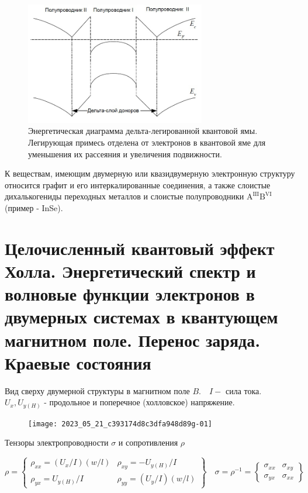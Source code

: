 \begin{figure} [h!]
\centering
    \includegraphics[width=0.7\textwidth]{images/ph28.4.jpg}
\caption*{Энергетическая диаграмма дельта-легированной квантовой ямы. Легирующая примесь отделена от электронов в квантовой яме для
уменьшения их рассеяния и увеличения подвижности.}
\end{figure}

К веществам, имеющим двумерную или квазидвумерную электронную структуру относится графит и его интеркалированные соединения, а также слоистые дихалькогениды переходных металлов и слоистые  полупроводники $\mathrm{A}^{\text {III}}\mathrm{B}^{\text {VI}}$ (пример - InSe).


\section{Целочисленный квантовый эффект Холла. Энергетический спектр и волновые функции электронов в двумерных системах в квантующем магнитном поле. Перенос заряда. Краевые состояния}

Вид сверху двумерной структуры в магнитном поле $B. \quad I-$ сила тока. $U_{x}, U_{y(H)}$ - продольное и поперечное (холловское) напряжение.

\begin{figure}[h!]
    \centering
    \texttt{[image: 2023\_05\_21\_c393174d8c3dfa948d89g-01]}
\end{figure}

Тензоры электропроводности $\sigma$ и сопротивления $\rho$

$$
\rho=\left\{\begin{array}{cc}
\rho_{x x}=\left(U_{x} / I\right)(w / l) & \rho_{x y}=-U_{y(H)} / I \\
\rho_{y x}=U_{y(H)} / I & \rho_{y y}=\left(U_{y} / I\right)(w / l)
\end{array}\right\} \quad \sigma=\rho^{-1}=\left\{\begin{array}{ll}
\sigma_{x x} & \sigma_{x y} \\
\sigma_{y x} & \sigma_{x x}
\end{array}\right\}
$$


